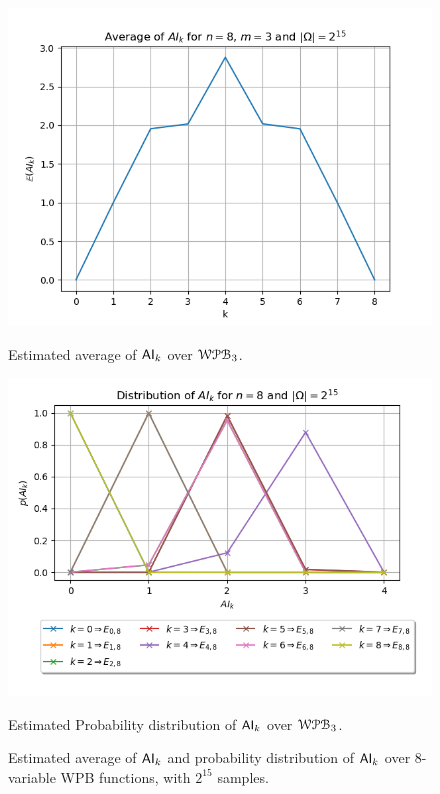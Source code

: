 \documentclass[11pt]{llncs}
\begin{document}
\begin{figure}[H]
    \centering
    \begin{minipage}[b]{0.45\textwidth}
        \centering
        \includegraphics[width=\textwidth]{images/WPB_3_sample_size_32768_average_a.png}
        \caption{Estimated average of $\mathsf{AI}_{k}$ over $\mathcal{WPB}_{3}$.}
        \label{fig:averages32768}
    \end{minipage}
    \hfill
    \begin{minipage}[b]{0.5\textwidth}
        \centering
        \includegraphics[width=\textwidth]{images/WPB_3_sample_size_32768_dist_prob_a.png}
        \caption{Estimated Probability distribution of $\mathsf{AI}_{k}$ over $\mathcal{WPB}_{3}$.}
        \label{fig:probDist32768}
    \end{minipage}
    \caption{Estimated average of $\mathsf{AI}_{k}$ and probability distribution of $\mathsf{AI}_{k}$ over $8$-variable WPB functions, with $2^{15}$ samples.}
    \label{fig:main2}
\end{figure}
\end{document}
